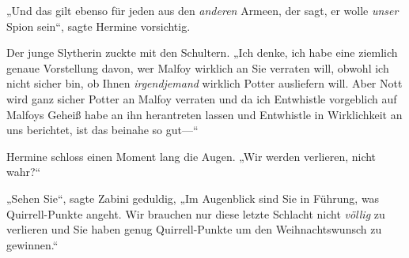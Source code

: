 „Und das gilt ebenso für jeden aus den \emph{anderen} Armeen, der sagt, er wolle \emph{unser} Spion sein“, sagte Hermine vorsichtig.

Der junge Slytherin zuckte mit den Schultern. „Ich denke, ich habe eine ziemlich genaue Vorstellung davon, wer Malfoy wirklich an Sie verraten will, obwohl ich nicht sicher bin, ob Ihnen \emph{irgendjemand} wirklich Potter ausliefern will. Aber Nott wird ganz sicher Potter an Malfoy verraten und da ich Entwhistle vorgeblich auf Malfoys Geheiß habe an ihn herantreten lassen und Entwhistle in Wirklichkeit an uns berichtet, ist das beinahe so gut—“

Hermine schloss einen Moment lang die Augen. „Wir werden verlieren, nicht wahr?“

„Sehen Sie“, sagte Zabini geduldig, „Im Augenblick sind Sie in Führung, was Quirrell-Punkte angeht. Wir brauchen nur diese letzte Schlacht nicht \emph{völlig} zu verlieren und Sie haben genug Quirrell-Punkte um den Weihnachtswunsch zu gewinnen.“

